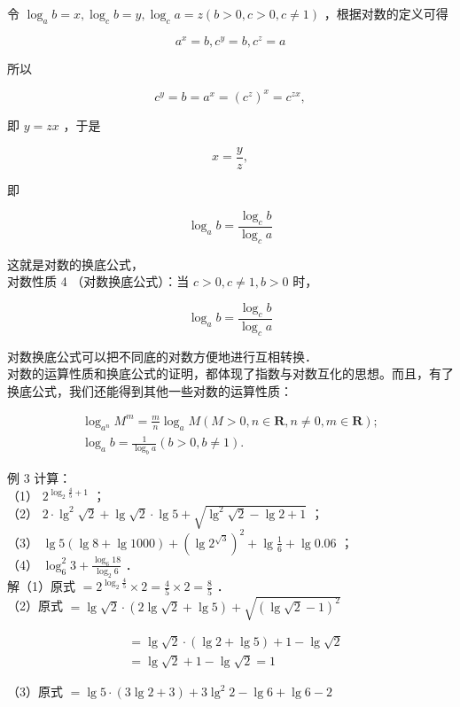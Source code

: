 \documentclass[10pt]{article}
\begin{document}
令 \(\log _{a} b=x, \log _{c} b=y, \log _{c} a=z(b>0, c>0, c \neq 1)\) ，根据对数的定义可得

\[
a^{x}=b, c^{y}=b, c^{z}=a
\]

所以

\[
c^{y}=b=a^{x}=\left(c^{z}\right)^{x}=c^{z x},
\]

即 \(y=z x\) ，于是

\[
x=\frac{y}{z},
\]

即

\[
\log _{a} b=\frac{\log _{c} b}{\log _{c} a}
\]

这就是对数的换底公式，\\
对数性质 4 （对数换底公式）：当 \(c>0, c \neq 1, b>0\) 时，

\[
\log _{a} b=\frac{\log _{c} b}{\log _{c} a}
\]

对数换底公式可以把不同底的对数方便地进行互相转换．\\
对数的运算性质和换底公式的证明，都体现了指数与对数互化的思想。而且，有了换底公式，我们还能得到其他一些对数的运算性质：

\[
\begin{gathered}
\log _{a^{n}} M^{m}=\frac{m}{n} \log _{a} M(M>0, n \in \mathbf{R}, n \neq 0, m \in \mathbf{R}) ; \\
\log _{a} b=\frac{1}{\log _{b} a}(b>0, b \neq 1) .
\end{gathered}
\]

例 3 计算：\\
（1） \(2^{\log _{2} \frac{4}{5}+1}\) ；\\
（2） \(2 \cdot \lg ^{2} \sqrt{2}+\lg \sqrt{2} \cdot \lg 5+\sqrt{\lg ^{2} \sqrt{2}-\lg 2+1}\) ；\\
（3） \(\lg 5(\lg 8+\lg 1000)+\left(\lg 2^{\sqrt{3}}\right)^{2}+\lg \frac{1}{6}+\lg 0.06\) ；\\
（4） \(\log _{6}^{2} 3+\frac{\log _{6} 18}{\log _{2} 6}\) ．\\
解（1）原式 \(=2^{\log _{2} \frac{4}{5}} \times 2=\frac{4}{5} \times 2=\frac{8}{5}\) ．\\
（2）原式 \(=\lg \sqrt{2} \cdot(2 \lg \sqrt{2}+\lg 5)+\sqrt{(\lg \sqrt{2}-1)^{2}}\)

\[
\begin{aligned}
& =\lg \sqrt{2} \cdot(\lg 2+\lg 5)+1-\lg \sqrt{2} \\
& =\lg \sqrt{2}+1-\lg \sqrt{2}=1
\end{aligned}
\]

（3）原式 \(=\lg 5 \cdot(3 \lg 2+3)+3 \lg ^{2} 2-\lg 6+\lg 6-2\)
\end{document}
